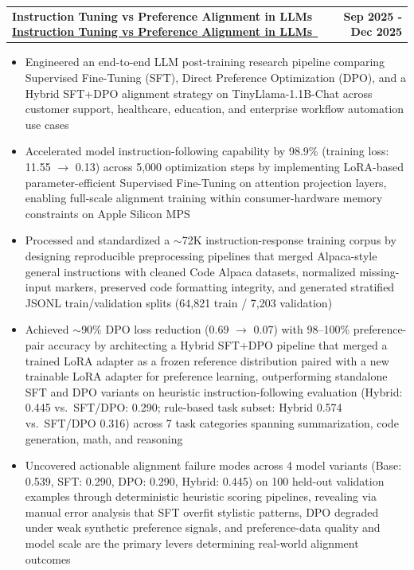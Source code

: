 \documentclass[letterpaper,11pt]{article}
\makeatletter
\newcommand{\resumeItem}[1]{
  \item\small{{#1 \vspace{-2pt}}}
}
\newcommand{\resumeProjectHeading}[4]{%
  \vspace{-2pt}\item
  \begin{tabular*}{1.001\textwidth}{l@{\extracolsep{\fill}}r}
    \small{%
      \ifthenelse{\equal{#1}{}}%
        {%
          \textbf{#2}%
          \ifthenelse{\equal{#3}{}}{}{ $|$ \emph{#3}}%
        }%
        {%
          \href{#1}{\underline{\textbf{#2}}~\faLink}%
          \ifthenelse{\equal{#3}{}}{}{ $|$ \emph{#3}}%
        }%
    } & \textbf{\small #4} \\
  \end{tabular*}\vspace{-7pt}
}
\newcommand{\resumeItemListStart}{\begin{itemize}}
\newcommand{\resumeItemListEnd}{\end{itemize}\vspace{-5pt}}
\makeatother
\begin{document}
        \resumeProjectHeading
            {https://www.github.com/lakshya46jain/instruction-vs-preference-alignment/}
            {Instruction Tuning vs Preference Alignment in LLMs}
            {Python (PyTorch), Hugging Face}
            {Sep 2025 - Dec 2025}
            \resumeItemListStart
                \resumeItem{Engineered an end-to-end LLM post-training research pipeline comparing Supervised Fine-Tuning (SFT), Direct Preference Optimization (DPO), and a Hybrid SFT+DPO alignment strategy on TinyLlama-1.1B-Chat across customer support, healthcare, education, and enterprise workflow automation use cases}
                \resumeItem{Accelerated model instruction-following capability by 98.9\% (training loss: 11.55 $\rightarrow$ 0.13) across 5,000 optimization steps by implementing LoRA-based parameter-efficient Supervised Fine-Tuning on attention projection layers, enabling full-scale alignment training within consumer-hardware memory constraints on Apple Silicon MPS}
                \resumeItem{Processed and standardized a $\sim$72K instruction-response training corpus by designing reproducible preprocessing pipelines that merged Alpaca-style general instructions with cleaned Code Alpaca datasets, normalized missing-input markers, preserved code formatting integrity, and generated stratified JSONL train/validation splits (64,821 train / 7,203 validation)}
                \resumeItem{Achieved $\sim$90\% DPO loss reduction (0.69 $\rightarrow$ 0.07) with 98--100\% preference-pair accuracy by architecting a Hybrid SFT+DPO pipeline that merged a trained LoRA adapter as a frozen reference distribution paired with a new trainable LoRA adapter for preference learning, outperforming standalone SFT and DPO variants on heuristic instruction-following evaluation (Hybrid: 0.445 vs.\ SFT/DPO: 0.290; rule-based task subset: Hybrid 0.574 vs.\ SFT/DPO 0.316) across 7 task categories spanning summarization, code generation, math, and reasoning}
                \resumeItem{Uncovered actionable alignment failure modes across 4 model variants (Base: 0.539, SFT: 0.290, DPO: 0.290, Hybrid: 0.445) on 100 held-out validation examples through deterministic heuristic scoring pipelines, revealing via manual error analysis that SFT overfit stylistic patterns, DPO degraded under weak synthetic preference signals, and preference-data quality and model scale are the primary levers determining real-world alignment outcomes}
            \resumeItemListEnd
        \vspace{-10pt}
\end{document}
